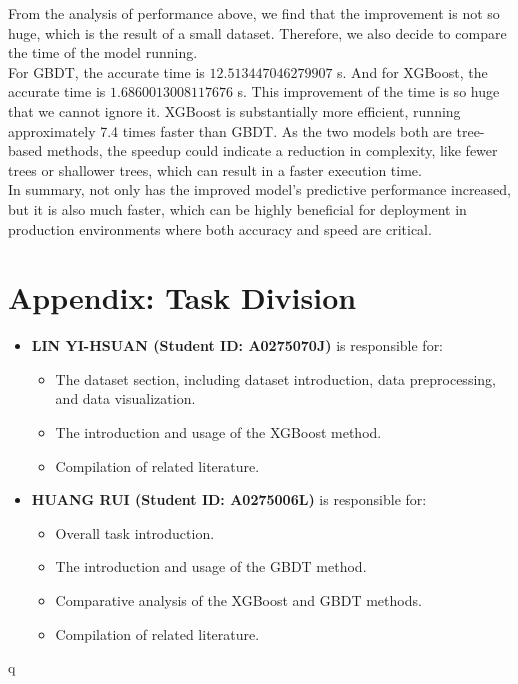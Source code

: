 \documentclass[12pt]{article}
\begin{document}
From the analysis of performance above, we find that the improvement is not so huge, which is the result of a small dataset. Therefore, we also decide to compare the time of the model running.\\

For GBDT, the accurate time is $12.513447046279907$ s. And for XGBoost, the accurate time is $1.6860013008117676$ s. This improvement of the time is so huge that we cannot ignore it. XGBoost is substantially more efficient, running approximately 7.4 times faster than GBDT. As the two models both are tree-based methods, the speedup could indicate a reduction in complexity, like fewer trees or shallower trees, which can result in a faster execution time.\\

In summary, not only has the improved model's predictive performance increased, but it is also much faster, which can be highly beneficial for deployment in production environments where both accuracy and speed are critical.

\newpage

\section*{Appendix: Task Division}
\begin{itemize}
    \item \textbf{LIN YI-HSUAN (Student ID: A0275070J)} is responsible for:
    \begin{itemize}
        \item The dataset section, including dataset introduction, data preprocessing, and data visualization.
        \item The introduction and usage of the XGBoost method.
        \item Compilation of related literature.
    \end{itemize}
    
    \item \textbf{HUANG RUI (Student ID: A0275006L)} is responsible for:
    \begin{itemize}
        \item Overall task introduction.
        \item The introduction and usage of the GBDT method.
        \item Comparative analysis of the XGBoost and GBDT methods.
        \item Compilation of related literature.
    \end{itemize}
\end{itemize}q
\end{document}
